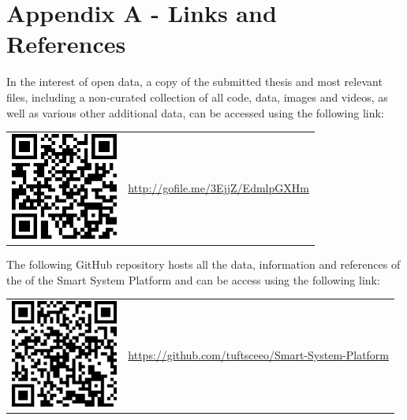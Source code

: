 \cleardoublepage%
\chapter*{\label{chap:apx_a}Appendix A - Links and References}
%

In the interest of open data, a copy of the submitted thesis and most relevant files, including a non-curated collection of all code, data, images and videos, as well as various other additional data, can be accessed using the following link:
\vspace{25pt}
\begin{center}
\begin{tabular}{>{\centering\arraybackslash} m{175pt} m{272pt}}
 \includegraphics[width=100pt]{images/Master Thesis-QRcode.png} & \url{http://gofile.me/3EjjZ/EdmlpGXHm}\\
\end{tabular}
\end{center}
\vspace{25pt}

The following GitHub repository hosts all the data, information and references of the of the Smart System Platform and can be access using the following link:
\vspace{25pt}
\begin{center}
\begin{tabular}{>{\centering\arraybackslash} m{175pt} m{272pt}}
 \includegraphics[width=100pt]{images/GitHub-QRcode.png} & 
 \url{https://github.com/tuftsceeo/Smart-System-Platform}\\
\end{tabular}
\end{center}
\vspace{25pt}

